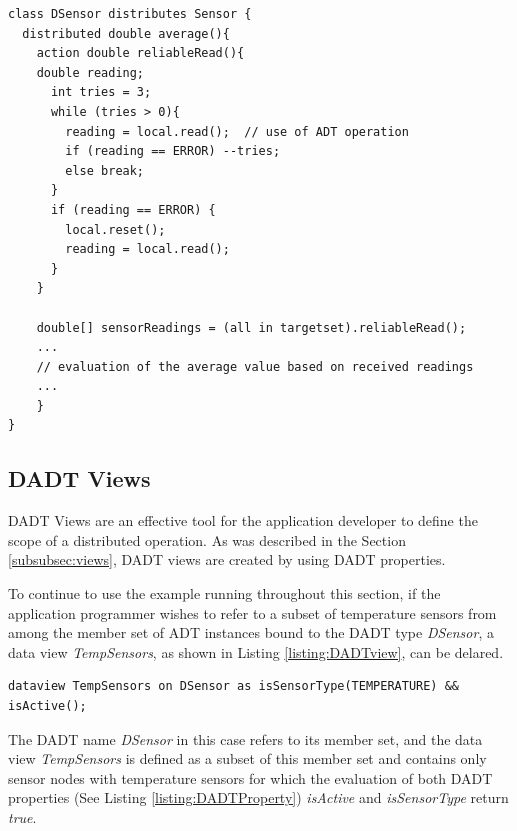 \begin{lstlisting}[frame=trbl, basewidth={0.55em, 0.6em}, captionpos=b, 
basicstyle=\ttfamily\footnotesize, breaklines, caption = Use of DADT Action (reproduced from \cite{migliavacca_DADT:2006}), label = listing:DADTAction]  
class DSensor distributes Sensor {
  distributed double average(){
    action double reliableRead(){
    double reading;
      int tries = 3;
      while (tries > 0){
        reading = local.read();  // use of ADT operation
        if (reading == ERROR) --tries;
        else break; 
      }
      if (reading == ERROR) {
        local.reset();
        reading = local.read();
      }
    }

    double[] sensorReadings = (all in targetset).reliableRead();
    ...
    // evaluation of the average value based on received readings	
    ...
    }
}
\end{lstlisting}

\subsection{DADT Views} \label{subsubsec:viewsImpl}

DADT Views are an effective tool for the application developer to
define the scope of a distributed operation. As was described in the Section
\ref{subsubsec:views}, DADT views are created by using DADT properties.

To continue to use the example running throughout this section, if the application programmer wishes to refer to a subset of temperature sensors from among the member set of ADT instances bound to the DADT type \emph{DSensor}, a data view \emph{TempSensors}, 
as shown in Listing \ref{listing:DADTview}, can be delared.
  
\begin{lstlisting}[frame=trbl, basewidth={0.55em, 0.6em}, captionpos=b, 
basicstyle=\ttfamily\footnotesize, breaklines, caption = Definition of DADT Data View, label = listing:DADTview ]  
dataview TempSensors on DSensor as isSensorType(TEMPERATURE) && isActive(); 
\end{lstlisting}

The DADT name \emph{DSensor} in this case refers to its member set, and 
the data view \emph{TempSensors} is defined as a subset of this member set and
contains only sensor nodes with temperature sensors for which the evaluation of
both DADT properties (See Listing \ref{listing:DADTProperty}) \emph{isActive}
and \emph{isSensorType} return \emph{true}. 

